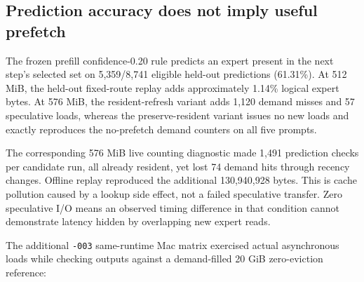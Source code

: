 \documentclass[11pt]{article}
\begin{document}
\hypertarget{prediction-accuracy-does-not-imply-useful-prefetch}{%
\subsection{Prediction accuracy does not imply useful prefetch}\label{prediction-accuracy-does-not-imply-useful-prefetch}}

The frozen prefill confidence-0.20 rule predicts an expert present in the
next step's selected set on
5,359/8,741 eligible held-out predictions
(61.31\%). At 512 MiB, the held-out fixed-route replay
adds approximately 1.14\% logical expert bytes. At 576 MiB, the resident-refresh
variant adds 1,120 demand misses and 57 speculative loads, whereas the
preserve-resident variant issues no new loads and exactly reproduces the
no-prefetch demand counters on all five prompts.

The corresponding 576 MiB live counting diagnostic made 1,491 prediction
checks per candidate run, all already resident, yet lost 74 demand hits
through recency changes. Offline replay reproduced the additional
130,940,928 bytes. This is cache pollution caused by a lookup side effect,
not a failed speculative transfer. Zero speculative I/O means an observed
timing difference in that condition cannot demonstrate latency hidden by
overlapping new expert reads.

The additional \texttt{-003} same-runtime Mac matrix exercised actual asynchronous
loads while checking outputs against a demand-filled 20 GiB zero-eviction
reference:
\end{document}
